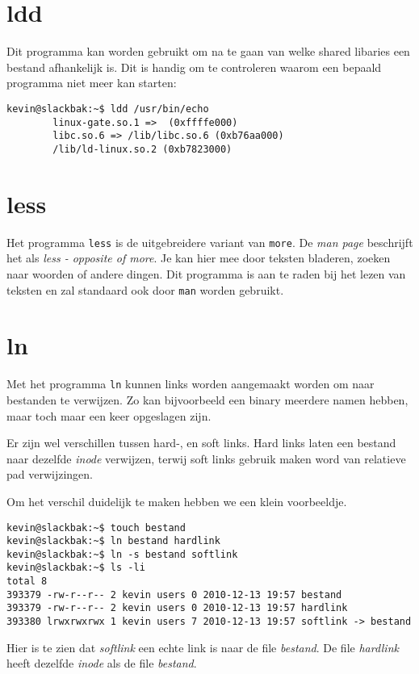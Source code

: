 \section{ldd}
Dit programma kan worden gebruikt om na te gaan van welke shared libaries een bestand afhankelijk is. Dit is handig om te controleren waarom een bepaald programma niet meer kan starten: 
\begin{lstlisting}
kevin@slackbak:~$ ldd /usr/bin/echo 
        linux-gate.so.1 =>  (0xffffe000)
        libc.so.6 => /lib/libc.so.6 (0xb76aa000)
        /lib/ld-linux.so.2 (0xb7823000)
\end{lstlisting}%

\section{less}
Het programma \texttt{less} is de uitgebreidere variant van \texttt{more}. De \emph{man page} beschrijft het als \emph{less - opposite of more}. Je kan hier mee door teksten bladeren, zoeken naar woorden of andere dingen. Dit programma is aan te raden bij het lezen van teksten en zal standaard ook door \texttt{man} worden gebruikt. 

\section{ln}
Met het programma \texttt{ln} kunnen links worden aangemaakt worden om naar bestanden te verwijzen. Zo kan bijvoorbeeld een binary meerdere namen hebben, maar toch maar een keer opgeslagen zijn. 

Er zijn wel verschillen tussen hard-, en soft links. Hard links laten een bestand naar dezelfde \emph{inode} verwijzen, terwij soft links gebruik maken word van relatieve pad verwijzingen. 

Om het verschil duidelijk te maken hebben we een klein voorbeeldje. 
\begin{lstlisting}
kevin@slackbak:~$ touch bestand
kevin@slackbak:~$ ln bestand hardlink
kevin@slackbak:~$ ln -s bestand softlink
kevin@slackbak:~$ ls -li
total 8
393379 -rw-r--r-- 2 kevin users 0 2010-12-13 19:57 bestand
393379 -rw-r--r-- 2 kevin users 0 2010-12-13 19:57 hardlink
393380 lrwxrwxrwx 1 kevin users 7 2010-12-13 19:57 softlink -> bestand
\end{lstlisting}
Hier is te zien dat \emph{softlink} een echte link is naar de file \emph{bestand}. De file \emph{hardlink} heeft dezelfde \emph{inode} als de file \emph{bestand}. 

